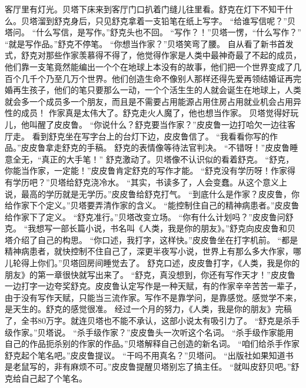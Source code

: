 \documentclass[a4paper,12pt,UTF8,twoside]{ctexbook}
\begin{document}
        客厅里有灯光。贝塔下床来到客厅门口扒着门缝儿往里看。舒克在灯下不知干什么。贝塔溜到舒克身后，只见舒克拿着一支铅笔在纸上写字。 
        “给谁写信呢？”贝塔问。 
        “什么写信，是写作。”舒克头也不回。 
        “写作？！”贝塔一愣，“什么写作？” 
        “就是写作品。”舒克不停笔。 
        “你想当作家？”贝塔笑弯了腰。 
        自从看了新书首发式，舒克对那些作家羡慕得不得了，他觉得作家是人类中最神奇最了不起的成员，他们靠一支笔竟然能编出一个个在地球上本没有的故事，他们把一个世界变成了几百个几千个乃至几万个世界。他们创造生命不像别人那样还得先爱再领结婚证再完婚再生孩子，他们的笔只要那么一动，一个个活生生的人就会诞生在地球上，人类就会多一个成员多一个朋友，而且是不需要占用能源占用住房占用就业机会占用异性的成员！ 
        作家真是太伟大了。舒克走火人魔了，他也想当作家。 
        贝塔觉得好玩儿，他叫醒了皮皮鲁。 
        “你说什么？舒克要当作家？”皮皮鲁一边打哈欠一边往客厅走。 
        看到舒克坐在写字台上的台灯下边，皮皮鲁信了。 
        “我看看你写的作品。”皮皮鲁拿走舒克的手稿。 
        舒克的表情像等待法官判决。 
        “不错呀！”皮皮鲁睡意全无，“真正的大手笔！” 
        舒克激动了。贝塔像不认识似的看着舒克。 
        “舒克，你能当作家，一定能！”皮皮鲁肯定舒克的写作才能。 
        “舒克没有学历呀！作家得有学历吧？”贝塔给舒克浇冷水。 
        “其实，书读多了，人会变蠢。从这个意义上说，最高的学历就是无学历。”皮皮鲁给舒克打气。 
        “到底什么是作家？皮皮鲁，你给作家下个定义。”贝塔要弄清作家的含义。 
        “能控制住自己的精神病患者。”皮皮鲁给作家下了定义。 
        “舒克准行。”贝塔改变立场。 
        “你有什么计划吗？”皮皮鲁问舒克。 
        “我想写一部长篇小说，书名叫《人类，我是你的朋友》。”舒克向皮皮鲁和贝塔介绍了自己的构思。 
        “你口述，我打字，这样快。”皮皮鲁坐在打字机前。 
        “都是精神病患者，就快控制不住自己了，深更半夜写小说，世界上有那么多大作家，哪儿轮得上你们。”贝塔回房间睡觉去了。 
        舒克口述，皮皮鲁打字，《人类，我是你的朋友》的第一章很快就写出来了。 
        “舒克，真没想到，你还有写作天才！”皮皮鲁一边打字一边夸奖舒克。皮皮鲁认定写作是一种天赋，有的作家辛辛苦苦一辈子，由于没有写作天赋，只能当三流作家。写作不是靠学问，是靠感觉。感觉学不来，是天生的。舒克的感觉很准。 
        经过一个月的努力，《人类，我是你的朋友》完稿了，全书80万字。就连贝塔也不能不承认，这部小说太有吸引力了。 
        “舒克是杀手级作家。”贝塔说。 
        “杀手级作家？”皮皮鲁头一次听这个名词。 
        “杀手级作家能用自己的作品扼杀别的作家的作品。”贝塔解释自己创造的新名词。 
        “咱们给杀手作家舒克起个笔名吧。”皮皮鲁提议。 
        “干吗不用真名？”贝塔问。 
        “出版社如果知道书是老鼠写的，非有麻烦不可。”皮皮鲁提醒贝塔别忘了搞主任。 
        “就叫皮舒贝吧。”舒克给自己起了个笔名。 
\end{document}
